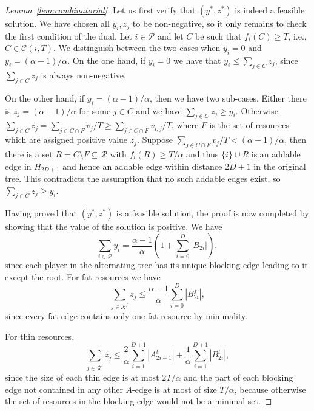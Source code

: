 \documentclass{llncs}
\newcommand{\res}{\ensuremath{\mathcal{R}}\xspace}
\newcommand{\players}{\ensuremath{\mathcal{P}}\xspace}
\newcommand{\conf}[1]{\ensuremath{\mathcal{C}(#1)}}
\begin{document}
\begin{proof}[Lemma~\ref{lem:combinatorial}]
Let us first verify that $(y^*, z^*)$ is indeed a feasible solution. We have
chosen all $y_i, z_j$ to be non-negative, so it only remains to check the first
condition of the dual. Let $i\in \players$ and let $C$ be such that $f_i(C)\geq
T$, i.e., $C\in \conf{i, T}$. We distinguish between the two cases when $y_i =
0$ and $y_i = (\alpha-1)/\alpha$. On the one hand, if $y_i = 0$ we have that
$y_i \leq \sum_{j\in C}z_j$, since $\sum_{j \in C} z_j$ is always non-negative.

On the other hand, if $y_i=(\alpha-1)/\alpha$, then we have two sub-cases.
Either there is $z_j=(\alpha-1)/\alpha$ for some $j\in C$ and we have
$\sum_{j\in C} z_j\geq y_i$.  Otherwise $\sum_{j\in C} z_j=\sum_{j\in C\cap F}
v_j/T\geq\sum_{j\in C\cap F} v_{i,j}/T$, where $F$ is the set of resources which
are assigned positive value $z_j$. Suppose $\sum_{j\in C\cap F}
v_j/T<(\alpha-1)/\alpha$, then there is a set $R=C\setminus F\subseteq \res$
with $f_i(R)\geq T/\alpha$ and thus $\{i\}\cup R$ is an addable edge in
$H_{2D+1}$ and hence an addable edge within distance $2D+1$ in the original tree.
This contradicts the assumption that no such addable edges
exist, so $\sum_{j\in C} z_j\ge y_i$.

Having proved that $(y^*,z^*)$ is a feasible solution, the proof is
now completed by showing that the value of the solution is positive.
We have
\begin{equation*}
\sum_{i\in \players}y_i=\frac{\alpha-1}{\alpha} \left(1+\sum_{i=0}^D
|B_{2i}|\right),
\end{equation*}
since each player in the alternating tree has its unique blocking edge leading
to it except the root. For fat resources we have
\begin{equation*}
\sum_{j\in \res^f}z_j\leq\frac{\alpha-1}{\alpha}\sum_{i=0}^D|B_{2i}^f|,
\end{equation*}
since every fat edge contains only one fat resource by minimality.

For thin resources,
\begin{equation*}
\sum_{j\in \res^t}z_j\leq \frac{2}{\alpha} \sum_{i=1}^{D+1}
|A^t_{2i-1}| + \frac{1}{\alpha} \sum_{i=1}^{D+1} |B^t_{2i}|,
\end{equation*}
since the size of each thin edge is at most $2T/\alpha$ and the part of each
blocking edge not contained in any other $A$-edge is at most of size $T/\alpha$,
because otherwise the set of resources in the blocking edge would not be a
minimal set.


\end{proof}
\end{document}
